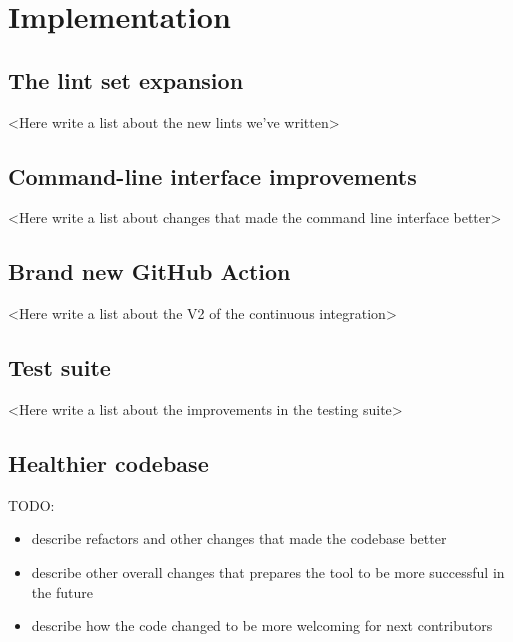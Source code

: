 \documentclass[licencjacka,en]{pracamgr}
\begin{document}

\chapter{Implementation}\label{r:chapter_implementation}

\section{The lint set expansion}\label{r:section_new_lints}

<Here write a list about the new lints we've written>

\section{Command-line interface improvements}\label{r:section_cli}

<Here write a list about changes that made the command line interface better>

\section{Brand new GitHub Action}\label{r:section_github_action}

<Here write a list about the V2 of the continuous integration>

\section{Test suite}\label{r:section_test_suite}

<Here write a list about the improvements in the testing suite>

\section{Healthier codebase}\label{r:section_healthier_codebase}

TODO:
\begin{itemize}
	\item describe refactors and other changes that made the codebase better
	\item describe other overall changes that prepares the tool to be more successful in the future
	\item describe how the code changed to be more welcoming for next contributors
\end{itemize}
\end{document}
